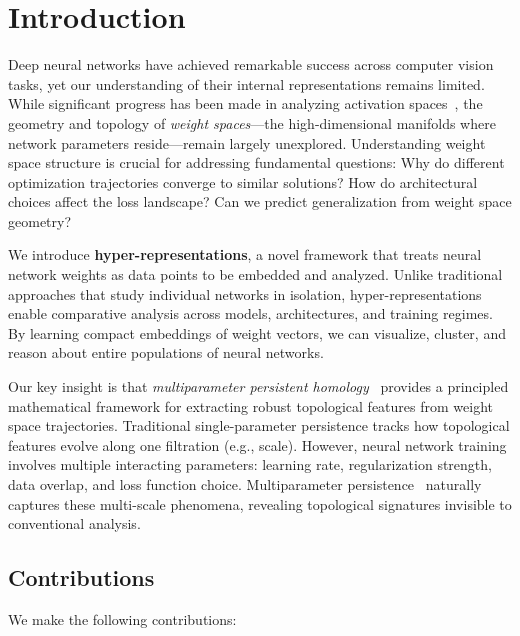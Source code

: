 \section{Introduction}
\label{sec:intro}

Deep neural networks have achieved remarkable success across computer vision tasks, yet our understanding of their internal representations remains limited. While significant progress has been made in analyzing activation spaces~\cite{carlssonTopologicalApproachesDeep2018}, the geometry and topology of \emph{weight spaces}---the high-dimensional manifolds where network parameters reside---remain largely unexplored. Understanding weight space structure is crucial for addressing fundamental questions: Why do different optimization trajectories converge to similar solutions? How do architectural choices affect the loss landscape? Can we predict generalization from weight space geometry?

We introduce \textbf{hyper-representations}, a novel framework that treats neural network weights as data points to be embedded and analyzed. Unlike traditional approaches that study individual networks in isolation, hyper-representations enable comparative analysis across models, architectures, and training regimes. By learning compact embeddings of weight vectors, we can visualize, cluster, and reason about entire populations of neural networks.

Our key insight is that \emph{multiparameter persistent homology}~\cite{carlssonTheoryMultidimensionalPersistence2009} provides a principled mathematical framework for extracting robust topological features from weight space trajectories. Traditional single-parameter persistence tracks how topological features evolve along one filtration (e.g., scale). However, neural network training involves multiple interacting parameters: learning rate, regularization strength, data overlap, and loss function choice. Multiparameter persistence~\cite{botnanBottleneckStabilityRank2024} naturally captures these multi-scale phenomena, revealing topological signatures invisible to conventional analysis.

\subsection{Contributions}

We make the following contributions:

